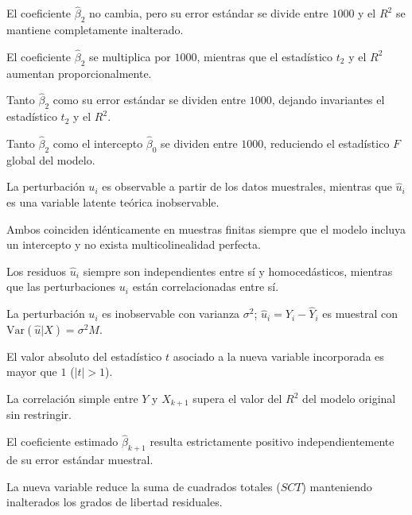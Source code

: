 \begin{opts}
    \item El coeficiente $\hat{\beta}_2$ no cambia, pero su error estándar se divide entre $1000$ y el $R^2$ se mantiene completamente inalterado.
    \item El coeficiente $\hat{\beta}_2$ se multiplica por $1000$, mientras que el estadístico $t_2$ y el $R^2$ aumentan proporcionalmente.
    \item Tanto $\hat{\beta}_2$ como su error estándar se dividen entre $1000$, dejando invariantes el estadístico $t_2$ y el $R^2$.
    \item Tanto $\hat{\beta}_2$ como el intercepto $\hat{\beta}_0$ se dividen entre $1000$, reduciendo el estadístico $F$ global del modelo.
\end{opts}

\begin{opts}
    \item La perturbación $u_i$ es observable a partir de los datos muestrales, mientras que $\hat{u}_i$ es una variable latente teórica inobservable.
    \item Ambos coinciden idénticamente en muestras finitas siempre que el modelo incluya un intercepto y no exista multicolinealidad perfecta.
    \item Los residuos $\hat{u}_i$ siempre son independientes entre sí y homocedásticos, mientras que las perturbaciones $u_i$ están correlacionadas entre sí.
    \item La perturbación $u_i$ es inobservable con varianza $\sigma^2$; $\hat{u}_i = Y_i - \hat{Y}_i$ es muestral con $\text{Var}(\hat{u}|X) = \sigma^2 M$.
\end{opts}

\begin{opts}
    \item El valor absoluto del estadístico $t$ asociado a la nueva variable incorporada es mayor que $1$ ($|t| > 1$).
    \item La correlación simple entre $Y$ y $X_{k+1}$ supera el valor del $R^2$ del modelo original sin restringir.
    \item El coeficiente estimado $\hat{\beta}_{k+1}$ resulta estrictamente positivo independientemente de su error estándar muestral.
    \item La nueva variable reduce la suma de cuadrados totales ($SCT$) manteniendo inalterados los grados de libertad residuales.
\end{opts}

